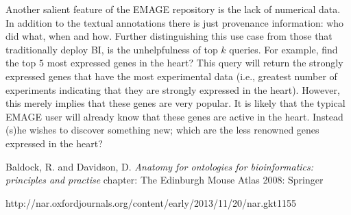 Another salient feature of the EMAGE repository is the lack of numerical data.  In addition to the textual annotations there is just provenance information: who did what, when and how.  Further distinguishing this use case from those that traditionally deploy BI, is the unhelpfulness of top $k$ queries.  For example, find the top $5$ most expressed genes in the heart?  This query will return the strongly expressed genes that have the most experimental data (i.e., greatest number of experiments indicating that they are strongly expressed in the heart).  However, this merely implies that these genes are very popular.  It is likely that the typical EMAGE user will already know that these genes are active in the heart.  Instead (s)he wishes to discover something new; which are the less renowned genes expressed in the heart?


\begin{thebibliography}{1}
 Baldock, R. and Davidson, D. {\em Anatomy for ontologies for bioinformatics: principles and practise} 
chapter: The Edinburgh Mouse Atlas 2008: Springer
 
 http://nar.oxfordjournals.org/content/early/2013/11/20/nar.gkt1155 
\end{thebibliography}